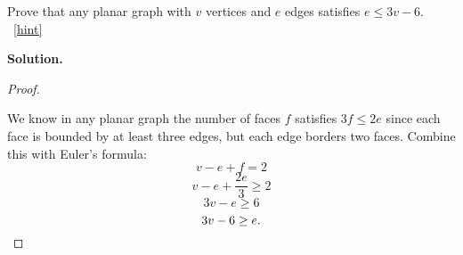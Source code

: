 \documentclass{book}
\begin{document}
\setcounter{project}{30}
\addtocounter{project}{-1}
\begin{activity}[]\label{activity-25}
\hypertarget{p-311}{}%
Prove that any planar graph with \(v\) vertices and \(e\) edges satisfies \(e \le 3v - 6\).%
~\hfill{\tiny\hyperlink{a-30}{[hint]}\hypertarget{q-30}{}}\par\smallskip%
\noindent\textbf{Solution.}\hypertarget{solution-25}{}\quad%
\begin{proof}\hypertarget{proof-3}{}
\hypertarget{p-313}{}%
We know in any planar graph the number of faces \(f\) satisfies \(3f \le 2e\) since each face is bounded by at least three edges, but each edge borders two faces. Combine this with Euler's formula:%
\begin{equation*}
v - e + f = 2
\end{equation*}
%
\begin{equation*}
v - e + \frac{2e}{3} \ge 2
\end{equation*}
%
\begin{equation*}
3v - e \ge 6
\end{equation*}
%
\begin{equation*}
3v - 6 \ge e.\qedhere
\end{equation*}
%
\end{proof}
\end{activity}
\end{document}
